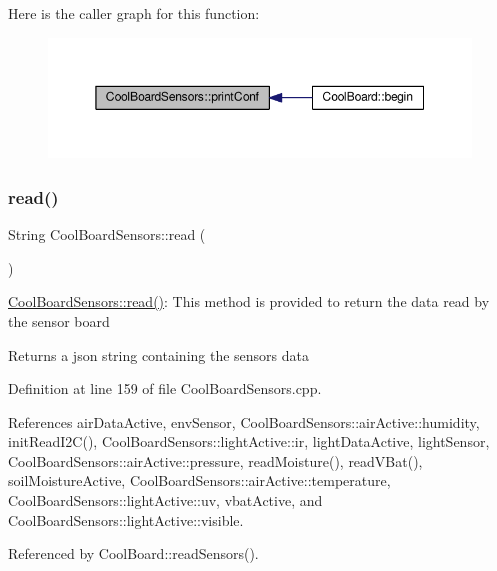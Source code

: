 Here is the caller graph for this function\+:
\nopagebreak
\begin{figure}[H]
\begin{center}
\leavevmode
\includegraphics[width=350pt]{classCoolBoardSensors_af6fd79505815b204c178617ecf54c873_icgraph}
\end{center}
\end{figure}
\mbox{\label{classCoolBoardSensors_a91badb2539d91fda8679f2a597874c48}} 
\subsubsection{\texorpdfstring{read()}{read()}}
{\footnotesize\ttfamily String Cool\+Board\+Sensors\+::read (\begin{DoxyParamCaption}{ }\end{DoxyParamCaption})}

\hyperlink{classCoolBoardSensors_a91badb2539d91fda8679f2a597874c48}{Cool\+Board\+Sensors\+::read()}\+: This method is provided to return the data read by the sensor board

\begin{DoxyReturn}{Returns}
a json string containing the sensors data 
\end{DoxyReturn}


Definition at line 159 of file Cool\+Board\+Sensors.\+cpp.



References air\+Data\+Active, env\+Sensor, Cool\+Board\+Sensors\+::air\+Active\+::humidity, init\+Read\+I2\+C(), Cool\+Board\+Sensors\+::light\+Active\+::ir, light\+Data\+Active, light\+Sensor, Cool\+Board\+Sensors\+::air\+Active\+::pressure, read\+Moisture(), read\+V\+Bat(), soil\+Moisture\+Active, Cool\+Board\+Sensors\+::air\+Active\+::temperature, Cool\+Board\+Sensors\+::light\+Active\+::uv, vbat\+Active, and Cool\+Board\+Sensors\+::light\+Active\+::visible.



Referenced by Cool\+Board\+::read\+Sensors().


